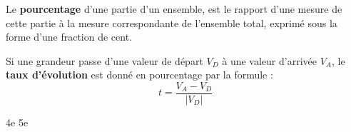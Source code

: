 \def\theme{Pourcentages et taux d'évolution.}
\def\date{23/10/2023}

\hbox{}

Le \textbf{pourcentage} d'une partie d'un ensemble, 
est le rapport d'une mesure de cette partie à la mesure correspondante de l'ensemble total, 
exprimé sous la forme d'une fraction de cent.

Si une grandeur passe d'une valeur de départ $V_D$ à une valeur d'arrivée $V_A$, 
le \textbf{taux d'évolution} est donné en pourcentage par la formule :
\begin{equation*}
    t = \frac{V_A-V_D}{|V_D|}
\end{equation*}

\csname 4e\endcsname
\csname 5e\endcsname
